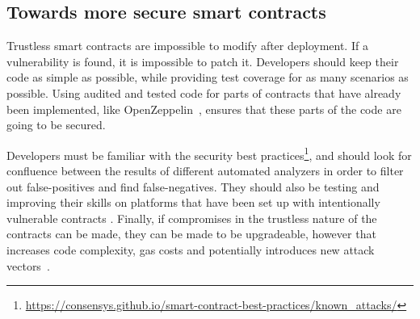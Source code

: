 \subsection{Towards more secure smart contracts}

Trustless smart contracts are impossible to modify after deployment. If a vulnerability is found, it is impossible to patch it. Developers should keep their code as simple as possible, while providing test coverage for as many scenarios as possible. Using audited and tested code for parts of contracts that have already been implemented, like OpenZeppelin~\cite{zeppelin-solidity}, ensures that these parts of the code are going to be secured. 

Developers must be familiar with the security best practices\footnote{\url{https://consensys.github.io/smart-contract-best-practices/known_attacks/}}, and should look for confluence between the results of different automated analyzers in order to filter out false-positives and find false-negatives. They should also be testing and improving their skills on platforms that have been set up with intentionally vulnerable contracts \cite{ethernaut, hackthiscontract, capturetheether}. Finally, if compromises in the trustless nature of the contracts can be made, they can be made to be upgradeable, however that increases code complexity, gas costs and potentially introduces new attack vectors~\cite{upgradeable-contracts}.